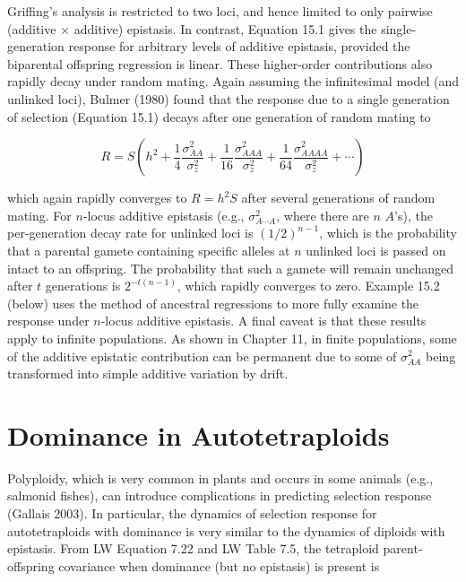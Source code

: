 \documentclass{article}
\begin{document}
Griffing’s analysis is restricted to two loci, and hence limited to only pairwise (additive × additive) epistasis. In contrast, Equation 15.1 gives the single-generation response for arbitrary levels of additive epistasis, provided the biparental offspring regression is linear. These higher-order contributions also rapidly decay under random mating. Again assuming the infinitesimal model (and unlinked loci), Bulmer (1980) found that the response due to a single generation of selection (Equation 15.1) decays after one generation of random mating to

\begin{equation}
R=S\left(h^{2}+\frac{1}{4}\frac{\sigma_{AA}^{2}}{\sigma_{z}^{2}}+\frac{1}{16}\frac{\sigma_{AAA}^{2}}{\sigma_{z}^{2}}+\frac{1}{64}\frac{\sigma_{AAAA}^{2}}{\sigma_{z}^{2}}+\cdots\right)
\tag{15.8}
\label{eq:15_8}
\end{equation}

which again rapidly converges to  $ R = h^2 S $ after several generations of random mating. For  $ n $-locus additive epistasis (e.g.,  $ \sigma_{A\cdots A}^2 $, where there are  $ n $  $ A $'s), the per-generation decay rate for unlinked loci is  $ (1/2)^{n-1} $, which is the probability that a parental gamete containing specific alleles at  $ n $ unlinked loci is passed on intact to an offspring. The probability that such a gamete will remain unchanged after  $ t $ generations is  $ 2^{-t(n-1)} $, which rapidly converges to zero. Example 15.2 (below) uses the method of ancestral regressions to more fully examine the response under  $ n $-locus additive epistasis. A final caveat is that these results apply to infinite populations. As shown in Chapter 11, in finite populations, some of the additive epistatic contribution can be permanent due to some of  $ \sigma_{AA}^2 $ being transformed into simple additive variation by drift.

\section{Dominance in Autotetraploids}
Polyploidy, which is very common in plants and occurs in some animals (e.g., salmonid fishes), can introduce complications in predicting selection response (Gallais 2003). In particular, the dynamics of selection response for autotetraploids with dominance is very similar to the dynamics of diploids with epistasis. From LW Equation 7.22 and LW Table 7.5, the tetraploid parent-offspring covariance when dominance (but no epistasis) is present is
\end{document}

